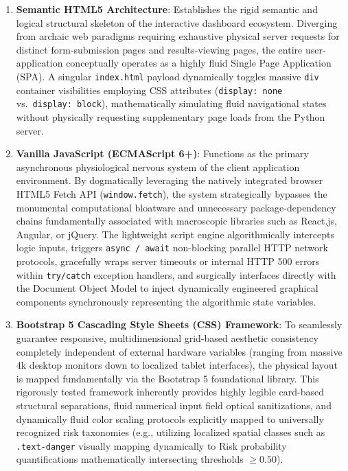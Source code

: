 \begin{enumerate}
\def\labelenumi{\arabic{enumi}.}
\tightlist
\item
  \textbf{Semantic HTML5 Architecture}: Establishes the rigid semantic
  and logical structural skeleton of the interactive dashboard
  ecosystem. Diverging from archaic web paradigms requiring exhaustive
  physical server requests for distinct form-submission pages and
  results-viewing pages, the entire user-application conceptually
  operates as a highly fluid Single Page Application (SPA). A singular
  \texttt{index.html} payload dynamically toggles massive \texttt{div}
  container visibilities employing CSS attributes
  (\texttt{display:\ none} vs.~\texttt{display:\ block}), mathematically
  simulating fluid navigational states without physically requesting
  supplementary page loads from the Python server.
\item
  \textbf{Vanilla JavaScript (ECMAScript 6+)}: Functions as the primary
  asynchronous physiological nervous system of the client application
  environment. By dogmatically leveraging the natively integrated
  browser HTML5 Fetch API (\texttt{window.fetch}), the system
  strategically bypasses the monumental computational bloatware and
  unnecessary package-dependency chains fundamentally associated with
  macroscopic libraries such as React.js, Angular, or jQuery. The
  lightweight script engine algorithmically intercepts logic inputs,
  triggers \texttt{async\ /\ await} non-blocking parallel HTTP network
  protocols, gracefully wraps server timeouts or internal HTTP 500
  errors within \texttt{try/catch} exception handlers, and surgically
  interfaces directly with the Document Object Model to inject
  dynamically engineered graphical components synchronously representing
  the algorithmic state variables.
\item
  \textbf{Bootstrap 5 Cascading Style Sheets (CSS) Framework}: To
  seamlessly guarantee responsive, multidimensional grid-based aesthetic
  consistency completely independent of external hardware variables
  (ranging from massive 4k desktop monitors down to localized tablet
  interfaces), the physical layout is mapped fundamentally via the
  Bootstrap 5 foundational library. This rigorously tested framework
  inherently provides highly legible card-based structural separations,
  fluid numerical input field optical sanitizations, and dynamically
  fluid color scaling protocols explicitly mapped to universally
  recognized risk taxonomies (e.g., utilizing localized spatial classes
  such as \texttt{.text-danger} visually mapping dynamically to Risk
  probability quantifications mathematically intersecting thresholds
  \(\ge 0.50\)).
\end{enumerate}

